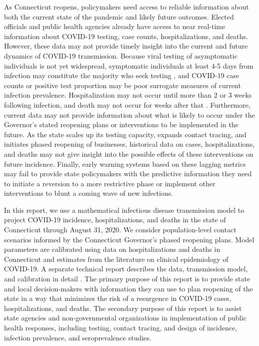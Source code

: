 \documentclass[11pt]{article}
\begin{document}
As Connecticut reopens, policymakers need access to reliable information about both the current state of the pandemic and likely future outcomes.  Elected officials and public health agencies already have access to near real-time information about COVID-19 testing, case counts, hospitalizations, and deaths.  However, these data may not provide timely insight into the current and future dynamics of COVID-19 transmission.  Because viral testing of asymptomatic individuals is not yet widespread, symptomatic individuals at least 4-5 days from infection may constitute the majority who seek testing \citep{lauer2020incubation, bi2020epidemiology, li2020early, linton2020incubation, he2020estimation, salje2020estimating, wei2020presymptomatic}, and COVID-19 case counts or positive test proportion may be poor surrogate measures of current infection prevalence.  Hospitalization may not occur until more than 2 or 3 weeks following infection, and death may not occur for weeks after that \citep{verity2020estimates, bi2020epidemiology, garg2020hospitalization, rees2020covid, lewnard2020incidence, paranjpe2020clinical}.  Furthermore, current data may not provide information about what is likely to occur under the Governor's stated reopening plans or interventions to be implemented in the future. As the state scales up its testing capacity, expands contact tracing, and initiates phased reopening of businesses, historical data on cases, hospitalizations, and deaths may not give insight into the possible effects of these interventions on future incidence.  Finally, early warning systems based on these lagging metrics may fail to provide state policymakers with the predictive information they need to initiate a reversion to a more restrictive phase or implement other interventions to blunt a coming wave of new infections. 


In this report, we use a mathematical infectious disease transmission model to project COVID-19 incidence, hospitalizations, and deaths in the state of Connecticut through August 31, 2020.  We consider population-level contact scenarios informed by the Connecticut Governor's phased reopening plans.  Model parameters are calibrated using data on hospitalizations and deaths in Connecticut and estimates from the literature on clinical epidemiology of COVID-19.  A separate technical report describes the data, transmission model, and calibration in detail \citep{morozova2020tech}.  The primary purpose of this report is to provide state and local decision-makers with information they can use to plan reopening of the state in a way that minimizes the risk of a resurgence in COVID-19 cases, hospitalizations, and deaths.  The secondary purpose of this report is to assist state agencies and non-governmental organizations in implementation of public health responses, including testing, contact tracing, and design of incidence, infection prevalence, and seroprevalence studies. 
\end{document}
